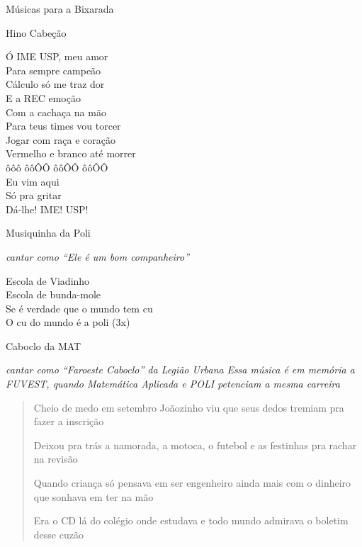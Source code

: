 \begin{secao}{Músicas para a Bixarada}

\begin{subsecao}{Hino Cabeção}


Ó IME USP, meu amor\\
Para sempre campeão\\
Cálculo só me traz dor\\
E a REC emoção\\

Com a cachaça na mão\\
Para teus times vou torcer\\
Jogar com raça e coração\\
Vermelho e branco até morrer\\

ôôô ôôÔÔ ôôÔÔ ôôÔÔ\\

Eu vim aqui\\
Só pra gritar\\
Dá-lhe! IME! USP!
\end{subsecao}

\begin{subsecao}{Musiquinha da Poli}

{\em cantar como ``Ele é um bom companheiro''}

Escola de Viadinho \\
Escola de bunda-mole \\
Se é verdade que o mundo tem cu \\
O cu do mundo é a poli  (3x)
\end{subsecao}

\begin{subsecao}{Caboclo da MAT}

{\em cantar como ``Faroeste Caboclo'' da Legião Urbana}
{\em Essa música é em memória a FUVEST, quando Matemática Aplicada e POLI 
petenciam a mesma carreira}
\begin{verse}
Cheio de medo em setembro Joãozinho viu que seus dedos tremiam pra fazer a
inscrição

Deixou pra trás a namorada, a motoca, o futebol e as festinhas pra rachar na
revisão

Quando criança só pensava em ser engenheiro ainda mais com o dinheiro que
sonhava em ter na mão

Era o CD lá do colégio onde estudava e todo mundo admirava o boletim desse
cuzão


\end{verse}
\end{subsecao}
\end{secao}
